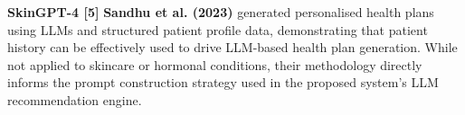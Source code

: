 \hspace*{0.3in}\textbf{SkinGPT-4 [5]} \hspace*{0.3in}\textbf{Sandhu et al. (2023)} generated personalised health plans using LLMs and structured patient profile data, demonstrating that patient history can be effectively used to drive LLM-based health plan generation. While not applied to skincare or hormonal conditions, their methodology directly informs the prompt construction strategy used in the proposed system's LLM recommendation engine.\\\\
